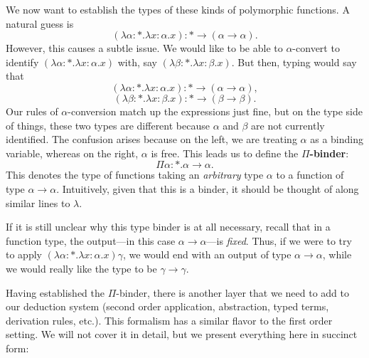 \documentclass{article}
\theoremstyle{definition}
\newcommand{\1}{\mathbb{1}}
\newcommand{\0}{\mathbb{0}}
\begin{document}
We now want to establish the types of these kinds of polymorphic functions. A natural guess is
\[(\lambda \alpha : * . \lambda x : \alpha . x) : * \to (\alpha \to \alpha).\]
However, this causes a subtle issue. We would like to be able to $\alpha$-convert to identify $(\lambda \alpha : * . \lambda x : \alpha . x)$ with, say $(\lambda \beta : * . \lambda x : \beta . x)$. But then, typing would say that
\[(\lambda \alpha : * . \lambda x : \alpha . x) : * \to (\alpha \to \alpha),\]
\[(\lambda \beta : * . \lambda x : \beta . x) : * \to (\beta \to \beta).\]
Our rules of $\alpha$-conversion match up the expressions just fine, but on the type side of things, these two types are different because $\alpha$ and $\beta$ are not currently identified. The confusion arises because on the left, we are treating $\alpha$ as a binding variable, whereas on the right, $\alpha$ is free. This leads us to define the \textbf{$\Pi$-binder}:
\[\Pi \alpha : * . \alpha \to \alpha.\]
This denotes the type of functions taking an \textit{arbitrary} type $\alpha$ to a function of type $\alpha \to \alpha$. Intuitively, given that this is a binder, it should be thought of along similar lines to $\lambda$. 

If it is still unclear why this type binder is at all necessary, recall that in a function type, the output—in this case $\alpha \to \alpha$—is \textit{fixed}. Thus, if we were to try to apply $(\lambda \alpha : * . \lambda x : \alpha . x)\gamma$, we would end with an output of type $\alpha \to \alpha$, while we would really like the type to be $\gamma \to \gamma$. 

Having established the $\Pi$-binder, there is another layer that we need to add to our deduction system (second order application, abstraction, typed terms, derivation rules, etc.). This formalism has a similar flavor to the first order setting. We will not cover it in detail, but we present everything here in succinct form:
\end{document}

